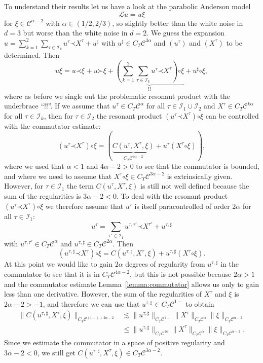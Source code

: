 \documentclass[a4paper, 11pt]{article}
\newcommand{\para}{\mathord{\prec}}
\newcommand{\lpara}{\mathord{\succ}}
\newcommand{\reso}{\mathord{\circ}}
\begin{document}
To understand their results let us have a look at the parabolic Anderson model
\[ \mathcal{L}u = u \xi \]
for $\xi \in \mathcal{C}^{\alpha - 2}$ with $\alpha \in (1 / 2, 2 / 3)$, so
slightly better than the white noise in $d = 3$ but worse than the white noise
in $d = 2$. We guess the expansion $u = \sum_{k = 1}^2 \sum_{\tau \in
\mathcal{I}_k} u^{\tau} \para X^{\tau} + u^{\sharp}$ with $u^{\sharp} \in C_T
\mathcal{C}^{3 \alpha}$ and $(u^{\tau})$ and $(X^{\tau})$ to be determined.
Then
\[ u \xi = u \para \xi_{} + u \lpara \xi + \underbrace{\left( \sum_{k = 1}^2
   \sum_{\tau \in \mathcal{I}_k} u^{\tau} \para X^{\tau} \right) \reso
   \xi}_{!!} + u^{\sharp} \reso \xi,
\]
where as before we single out the problematic resonant product with the underbrace ``!!''. If we assume that $u^{\tau} \in C_T \mathcal{C}^{\alpha}$ for all $\tau \in \mathcal{I}_1 \cup \mathcal{I}_2$ and
$X^{\tau} \in C_T \mathcal{C}^{k \alpha}$ for all $\tau \in \mathcal{I}_k$,
then for $\tau \in \mathcal{I}_2$ the resonant product $(u^{\tau} \para
X^{\tau}) \reso \xi$ can be controlled with the commutator estimate:
\[ (u^{\tau} \para X^{\tau}) \reso \xi = (\underbrace{C (u^{\tau}, X^{\tau},
   \xi)}_{C_T \mathcal{C}^{4 \alpha - 2}} + u^{\tau} (X^{\tau} \reso \xi)), \]
where we used that $\alpha < 1$ and $4 \alpha - 2 > 0$ to see that the
commutator is bounded, and where we need to assume that $X^{\tau} \reso \xi
\in C_T \mathcal{C}^{3 \alpha - 2}$ is extrinsically given. However, for $\tau
\in \mathcal{I}_1$ the term $C (u^{\tau}, X^{\tau}, \xi)$ is still not
well defined because the sum of the regularities is $3 \alpha - 2 < 0$. To
deal with the resonant product $(u^{\tau} \para X^{\tau}) \reso \xi$ we
therefore assume that $u^{\tau}$ is itself paracontrolled of order $2 \alpha$
for all $\tau \in \mathcal{I}_1$:
\[ u^{\tau} = \sum_{\tau' \in \mathcal{I}_1} u^{\tau, \tau'} \para X^{\tau'} +
   u^{\tau, \sharp} \]
with $u^{\tau, \tau'} \in C_T \mathcal{C}^{\alpha}$ and $u^{\tau, \sharp} \in
C_T \mathcal{C}^{2 \alpha}$. Then
\[ (u^{\tau, \sharp} \para X^{\tau}) \reso \xi = C (u^{\tau, \sharp},
   X^{\tau}, \xi) + u^{\tau, \sharp} (X^{\tau} \reso \xi) . \]
At this point we would like to gain $2 \alpha$ degrees of regularity from
$u^{\tau, \sharp}$ in the commutator to see that it is in $C_T \mathcal{C}^{4
\alpha - 2}$, but this is not possible because $2 \alpha > 1$ and the
commutator estimate Lemma~\ref{lemma:commutator} allows us only to gain less
than one derivative. However, the sum of the regularities of $X^{\tau}$ and
$\xi$ is $2 \alpha - 2 > - 1$, and therefore we can use that $u^{\tau,
\sharp} \in C_T \mathcal{C}^{1 -}$ to obtain
\begin{align*}
   \| C (u^{\tau, \sharp}, X^{\tau}, \xi) \|_{C_T \mathcal{C}^{(1 -) + 2 \alpha - 2}} & \lesssim \| u^{\tau, \sharp} \|_{C_T \mathcal{C}^{1 -}} \| X^{\tau} \|_{C_T \mathcal{C}^{\alpha}} \| \xi \|_{C_T \mathcal{C}^{\alpha -  2}} \\
   & \leqslant \| u^{\tau, \sharp} \|_{C_T \mathcal{C}^{2 \alpha}} \| X^{\tau} \|_{C_T \mathcal{C}^{\alpha}} \| \xi \|_{C_T \mathcal{C}^{\alpha -  2}}.
\end{align*}
Since we estimate the commutator in a space of positive regularity and $3\alpha-2 < 0$, we still get $C (u^{\tau, \sharp}, X^{\tau}, \xi)
\in C_T \mathcal{C}^{3 \alpha - 2}$.
\end{document}
